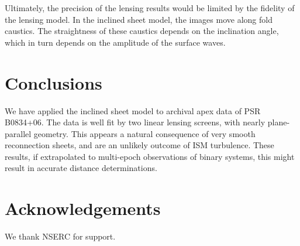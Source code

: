\documentclass[useAMS,usenatbib]{mn2e}
\begin{document}
Ultimately, the precision of the lensing results would be limited by
the fidelity of the lensing model.  In the inclined sheet model, the
images move along fold caustics.  The straightness of these caustics
depends on the inclination angle, which in turn depends on the
amplitude of the surface waves.  

\section{Conclusions}

We have applied the \citet{2014MNRAS.442.3338P} inclined
sheet model to archival apex data of PSR B0834+06.  The data is well
fit by two linear lensing screens, with nearly plane-parallel
geometry.  This appears a natural consequence of very smooth
reconnection sheets, and are an unlikely outcome of ISM turbulence.
These results, if extrapolated to multi-epoch observations of binary
systems, this might result in accurate distance determinations.


\section{Acknowledgements}

We thank NSERC for support.


\newcommand{\araa}{ARA\&A}   %
\newcommand{\afz}{Afz}       %
\newcommand{\aj}{AJ}         %
\newcommand{\azh}{AZh}       %
\newcommand{\aaa}{A\&A}      %
\newcommand{\aas}{A\&AS}     %
\newcommand{\aar}{A\&AR}     %
\newcommand{\apj}{ApJ}       %
\newcommand{\apjs}{ApJS}     %
\newcommand{\apjl}{ApJ}      %
\newcommand{\apss}{Ap\&SS}   %
\newcommand{\baas}{BAAS}     %
\newcommand{\jaa}{JA\&A}     %
\newcommand{\mnras}{MNRAS}   %
\newcommand{\nat}{Nat}       %
\newcommand{\pasj}{PASJ}     %
\newcommand{\pasp}{PASP}     %
\newcommand{\paspc}{PASPC}   %
\newcommand{\qjras}{QJRAS}   %
\newcommand{\sci}{Sci}       %
\newcommand{\solphys}{Solar Physics}       %
\newcommand{\sova}{SvA}      %
\newcommand{\aap}{A\&A}
\newcommand\jcap{{J. Cosmology Astropart. Phys.}}%
\newcommand{\prd}{Phys. Rev. D}






\label{lastpage}
\end{document}

